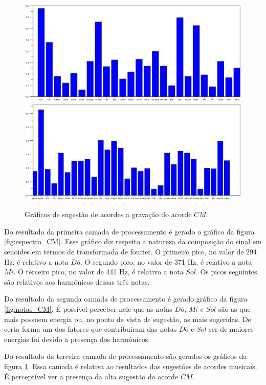 \begin{figure}[h]
	\centering
		\includegraphics[keepaspectratio=true,scale=0.45]{figuras/CM/acordes_1_cm.eps}
		\includegraphics[keepaspectratio=true,scale=0.45]{figuras/CM/acordes_2_cm.eps}
	\caption{Gráficos de sugestão de acordes a gravação do acorde $CM$.}
  \label{fig:acordes_CM}
\end{figure}
\newpage
Do resultado da primeira camada de processamento é gerado o gráfico da figura \ref{fig:espectro_CM}. Esse gráfico diz respeito a natureza da composição do sinal em senoides em termos de transformada de fourier. O primeiro pico, no valor de 294 Hz, é relativo a nota $Dó$. O segundo pico, no valor de 371 Hz, é relativo a nota $Mi$. O terceiro pico, no valor de 441 Hz, é relativo a nota $Sol$. Os picos seguintes são relativos aos harmônicos dessas três notas.

Do resultado da segunda camada de processamento é gerado gráfico da figura \ref{fig:notas_CM}. É possível perceber nele que as notas $Dó$, $Mi$ e $Sol$ são as que mais possuem energia ou, no ponto de vista de sugestão, as mais sugeridas. De certa forma um dos fatores que contribuiram das notas $Dó$ e $Sol$ ser de maiores energias foi devido a presença dos harmônicos.

Do resultado da terceira camada de processamento são gerados os gráficos da figura \ref{fig:acordes_CM}. Essa camada é relativa ao resultados das sugestões de acordes musicais. É perceptível ver a presença da alta sugestão do acorde $CM$.

